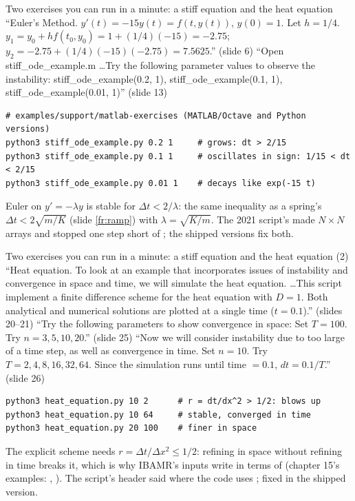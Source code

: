 \documentclass[aspectratio=169,11pt]{beamer}
\begin{document}
\begin{frame}[fragile]{Two exercises you can run in a minute: a stiff equation and the heat equation}
\label{fr:exercises}
\footnotesize ``Euler's Method. $y'(t) = -15y(t) = f(t, y(t))$, $y(0) = 1$. Let $h = 1/4$. $y_1 = y_0 + h f(t_0, y_0) = 1 + (1/4)(-15) = -2.75$; $y_2 = -2.75 + (1/4)(-15)(-2.75) = 7.5625$.'' (slide 6) ``Open stiff\_ode\_example.m \ldots Try the following parameter values to observe the instability: stiff\_ode\_example(0.2, 1), stiff\_ode\_example(0.1, 1), stiff\_ode\_example(0.01, 1)'' (slide 13)
\begin{lstlisting}[style=shelltiny]
# examples/support/matlab-exercises (MATLAB/Octave and Python versions)
python3 stiff_ode_example.py 0.2 1     # grows: dt > 2/15
python3 stiff_ode_example.py 0.1 1     # oscillates in sign: 1/15 < dt < 2/15
python3 stiff_ode_example.py 0.01 1    # decays like exp(-15 t)
\end{lstlisting}
\scriptsize Euler on $y' = -\lambda y$ is stable for $\Delta t < 2/\lambda$: the same inequality as a spring's $\Delta t < 2\sqrt{m/K}$ (slide \ref{fr:ramp}) with $\lambda = \sqrt{K/m}$. The 2021 script's  made $N\times N$ arrays and stopped one step short of ; the shipped versions fix both.

\end{frame}

\begin{frame}[fragile]{Two exercises you can run in a minute: a stiff equation and the heat equation (2)}
\label{fr:exercises2}
\footnotesize ``Heat equation. To look at an example that incorporates issues of instability and convergence in space and time, we will simulate the heat equation. \ldots This script implement a finite difference scheme for the heat equation with $D = 1$. Both analytical and numerical solutions are plotted at a single time ($t = 0.1$).'' (slides 20--21) ``Try the following parameters to show convergence in space: Set $T = 100$. Try $n = 3, 5, 10, 20$.'' (slide 25) ``Now we will consider instability due to too large of a time step, as well as convergence in time. Set $n = 10$. Try $T = 2, 4, 8, 16, 32, 64$. Since the simulation runs until time $= 0.1$, $dt = 0.1/T$.'' (slide 26)
\begin{lstlisting}[style=shelltiny]
python3 heat_equation.py 10 2      # r = dt/dx^2 > 1/2: blows up
python3 heat_equation.py 10 64     # stable, converged in time
python3 heat_equation.py 20 100    # finer in space
\end{lstlisting}
\scriptsize The explicit scheme needs $r = \Delta t/\Delta x^2 \le 1/2$: refining in space without refining in time breaks it, which is why IBAMR's inputs write  in terms of  (chapter 15's examples: , ). The script's header said  where the code uses ; fixed in the shipped version.
\end{frame}
\end{document}
